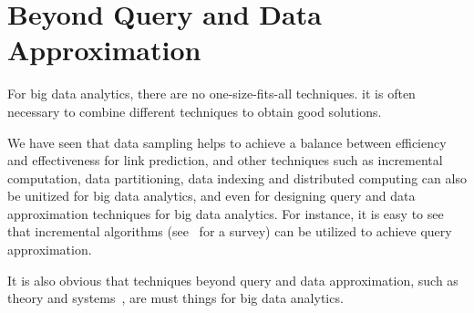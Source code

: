 \section{Beyond Query and Data Approximation}
\label{sec-beyond}

  For big data analytics, there are no one-size-fits-all techniques.  it is often necessary to combine different techniques to obtain good solutions.


We have seen that data sampling helps to achieve a balance between efficiency and effectiveness for link prediction,
and other techniques such as incremental computation, data partitioning, data indexing and distributed computing can
also be unitized for big data analytics, and even for designing query and data approximation techniques for big data analytics.
For instance, it is easy to see that incremental algorithms (see~\cite{Reps96} for a survey) can be utilized to achieve query approximation.

It is also obvious that techniques beyond query and data approximation, such as theory and systems~\cite{FanGN13,Jordan15,ZahariaXWDADMRV16}, are must things for big data analytics.

